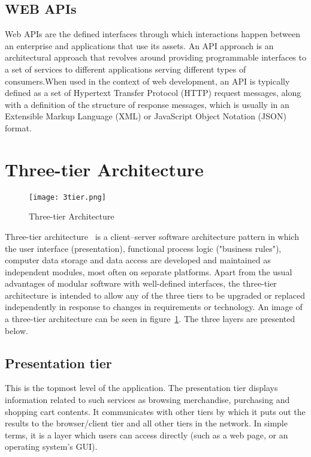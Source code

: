 \subsection{WEB APIs}
Web APIs are the defined interfaces through which interactions happen between an enterprise and applications that use its assets. An API approach is an architectural approach that revolves around providing programmable interfaces to a set of services to different applications serving different types of consumers.When used in the context of web development, an API is typically defined as a set of Hypertext Transfer Protocol (HTTP) request messages, along with a definition of the structure of response messages, which is usually in an Extensible Markup Language (XML) or JavaScript Object Notation (JSON) format.

\section{Three-tier Architecture}
\label{3tierarch}
\begin{figure}
	\texttt{[image: 3tier.png]}
	\caption{Three-tier Architecture}
	\label{3tier}
\end{figure}

Three-tier architecture~\cite{ramirez2000three} is a client–server software architecture pattern in which the user interface (presentation), functional process logic ("business rules"), computer data storage and data access are developed and maintained as independent modules, most often on separate platforms. Apart from the usual advantages of modular software with well-defined interfaces, the three-tier architecture is intended to allow any of the three tiers to be upgraded or replaced independently in response to changes in requirements or technology. An image of a three-tier architecture can be seen in figure~\ref{3tier}. The three layers are presented below.

\subsection{Presentation tier}
This is the topmost level of the application. The presentation tier displays information related to such services as browsing merchandise, purchasing and shopping cart contents. It communicates with other tiers by which it puts out the results to the browser/client tier and all other tiers in the network. In simple terms, it is a layer which users can access directly (such as a web page, or an operating system's GUI).

